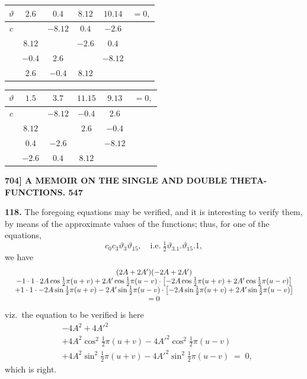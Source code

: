 \documentclass[11pt]{article}
\begin{document}
{\smallskip
\begin{center}
\begin{tabular}{c|cccc|c}\hline
$\vartheta$ & $2.6$ & $0.4$ & $8.12$ & $10.14$ & $=0,$\\\hline
$c$ & & $-8.12$ & $0.4$ & $-2.6$ & \\
& $8.12$ & & $-2.6$ & $0.4$ & \\
& $-0.4$ & $2.6$ & & $-8.12$ & \\
& $2.6$ & $-0.4$ & $8.12$ & & \\\hline
\end{tabular}
\hspace{0.8em}
\begin{tabular}{c|cccc|c}\hline
$\vartheta$ & $1.5$ & $3.7$ & $11.15$ & $9.13$ & $=0,$\\\hline
$c$ & & $-8.12$ & $-0.4$ & $2.6$ & \\
& $8.12$ & & $2.6$ & $-0.4$ & \\
& $0.4$ & $-2.6$ & & $-8.12$ & \\
& $-2.6$ & $0.4$ & $8.12$ & & \\\hline
\end{tabular}
\end{center}
}

\newpage
\noindent\textbf{704] \quad A MEMOIR ON THE SINGLE AND DOUBLE THETA-FUNCTIONS. \hfill 547}

\medskip
\textbf{118.} The foregoing equations may be verified, and it is interesting to verify them, by means of the approximate values of the functions; thus, for one of the equations,
\[
c_0c_3\vartheta_3\vartheta_{15},\quad\text{i.e.}\ \tfrac{1}{2}\vartheta_3.1.\vartheta_{15}.1,
\]
we have
\[
\resizebox{\textwidth}{!}{$\displaystyle
\begin{array}{c}
(2A + 2A')(-2A + 2A')\\
- 1\cdot 1\cdot 2A\cos\tfrac{1}{2}\pi(u+v) + 2A'\cos\tfrac{1}{2}\pi(u-v)\cdot\bigl[-2A\cos\tfrac{1}{2}\pi(u+v) + 2A'\cos\tfrac{1}{2}\pi(u-v)\bigr]\\
+ 1\cdot 1\cdot -2A\sin\tfrac{1}{2}\pi(u+v) - 2A'\sin\tfrac{1}{2}\pi(u-v)\cdot\bigl[-2A\sin\tfrac{1}{2}\pi(u+v) + 2A'\sin\tfrac{1}{2}\pi(u-v)\bigr]\\
=0
\end{array}
$}
\]
viz.\ the equation to be verified is here
\[
\begin{aligned}
& -4A^2 + 4A'^2\\
& + 4A^2\cos^2\tfrac{1}{2}\pi(u+v) - 4A'^2\cos^2\tfrac{1}{2}\pi(u-v)\\
& + 4A^2\sin^2\tfrac{1}{2}\pi(u+v) - 4A'^2\sin^2\tfrac{1}{2}\pi(u-v) \;=\; 0,
\end{aligned}
\]
which is right.
\end{document}
